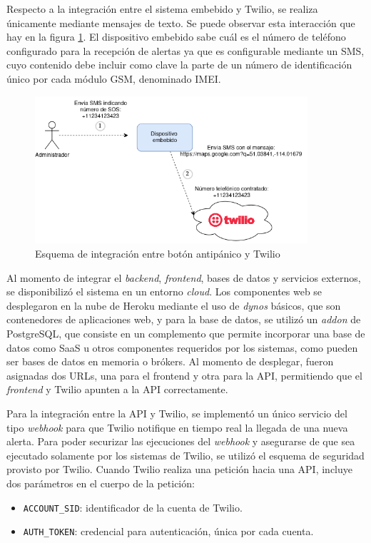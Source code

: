Respecto a la integración entre el sistema embebido y Twilio, se realiza únicamente mediante mensajes de texto. Se puede observar esta interacción que hay en la figura \ref{integracion:1}. El dispositivo embebido sabe cuál es el número de teléfono configurado para la recepción de alertas ya que es configurable mediante un SMS, cuyo contenido debe incluir como clave la parte de un número de identificación único por cada módulo GSM, denominado IMEI\citep{IMEI:1}.

\begin{figure}[H]
	\centering
	\includegraphics[width=0.9\textwidth]{./Figures/integracion-1.png}
	\caption{Esquema de integración entre botón antipánico y Twilio}
	\label{integracion:1}
\end{figure}

Al momento de integrar el \textit{backend}, \textit{frontend}, bases de datos y servicios externos, se disponibilizó el sistema en un entorno \textit{cloud}. Los componentes web se desplegaron en la nube de Heroku mediante el uso de \textit{dynos} básicos, que son contenedores de aplicaciones web\citep{HEROKU:1}, y para la base de datos, se utilizó un \textit{addon} de PostgreSQL, que consiste en un complemento que permite incorporar una base de datos como SaaS u otros componentes requeridos por los sistemas, como pueden ser bases de datos en memoria o brókers\citep{HEROKU:2}. Al momento de desplegar, fueron asignadas dos URLs, una para el frontend y otra para la API, permitiendo que el \textit{frontend} y Twilio apunten a la API correctamente.

Para la integración entre la API y Twilio, se implementó un único servicio del tipo \textit{webhook} para que Twilio notifique en tiempo real la llegada de una nueva alerta. Para poder securizar las ejecuciones del \textit{webhook} y asegurarse de que sea ejecutado solamente por los sistemas de Twilio, se utilizó el esquema de seguridad provisto por Twilio. Cuando Twilio realiza una petición hacia una API, incluye dos parámetros en el cuerpo de la petición\citep{TWILIO:2}:
\begin{itemize}
	\item \texttt{ACCOUNT\_SID}: identificador de la cuenta de Twilio.
	\item \texttt{AUTH\_TOKEN}: credencial para autenticación, única por cada cuenta.
\end{itemize}

